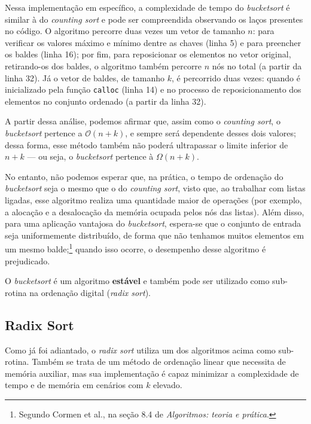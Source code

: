 \documentclass[fontsize=10pt]{article}
\begin{document}
\quad Nessa implementação em específico, a complexidade de tempo do \textit{bucketsort} é similar à do \textit{counting sort} e pode ser compreendida observando os laços presentes no código. O algoritmo percorre duas vezes um vetor de tamanho $n$: para verificar os valores máximo e mínimo dentre as chaves (linha 5) e para preencher os baldes (linha 16); por fim, para reposicionar os elementos no vetor original, retirando-os dos baldes, o algoritmo também percorre $n$ nós no total (a partir da linha 32). Já o vetor de baldes, de tamanho $k$, é percorrido duas vezes: quando é inicializado pela função \texttt{calloc} (linha 14) e no processo de reposicionamento dos elementos no conjunto ordenado (a partir da linha 32).

\quad A partir dessa análise, podemos afirmar que, assim como o \textit{counting sort}, o \textit{bucketsort} pertence a $\mathcal{O}(n + k)$, e sempre será dependente desses dois valores; dessa forma, esse método também não poderá ultrapassar o limite inferior de $n + k$ — ou seja, o \textit{bucketsort} pertence à $\Omega(n + k)$.

\quad No entanto, não podemos esperar que, na prática, o tempo de ordenação do \textit{bucketsort} seja o mesmo que o do \textit{counting sort}, visto que, ao trabalhar com listas ligadas, esse algoritmo realiza uma quantidade maior de operações (por exemplo, a alocação e a desalocação da memória ocupada pelos nós das listas). Além disso, para uma aplicação vantajosa do \textit{bucketsort}, espera-se que o conjunto de entrada seja uniformemente distribuído, de forma que não tenhamos muitos elementos em um mesmo balde;\footnote{Segundo Cormen et al., na seção 8.4 de \textit{Algoritmos: teoria e prática}\cite{cormen}.} quando isso ocorre, o desempenho desse algoritmo é prejudicado.

\quad O \textit{bucketsort} é um algoritmo \textbf{estável} e também pode ser utilizado como sub-rotina na ordenação digital (\textit{radix sort}).

\subsection{Radix Sort}

\quad Como já foi adiantado, o \textit{radix sort} utiliza um dos algoritmos acima como sub-rotina. Também se trata de um método de ordenação linear que necessita de memória auxiliar, mas sua implementação é capaz minimizar a complexidade de tempo e de memória em cenários com $k$ elevado.
\end{document}

